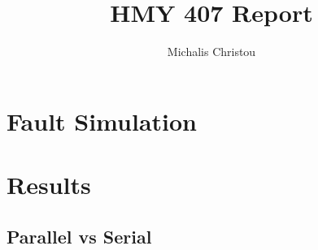 \documentclass{article}
\author{Michalis Christou}
\title{HMY 407 Report}
\begin{document}
\maketitle

\section*{Fault Simulation}


\section*{Results}
\subsection*{Parallel vs Serial}
\end{document}
